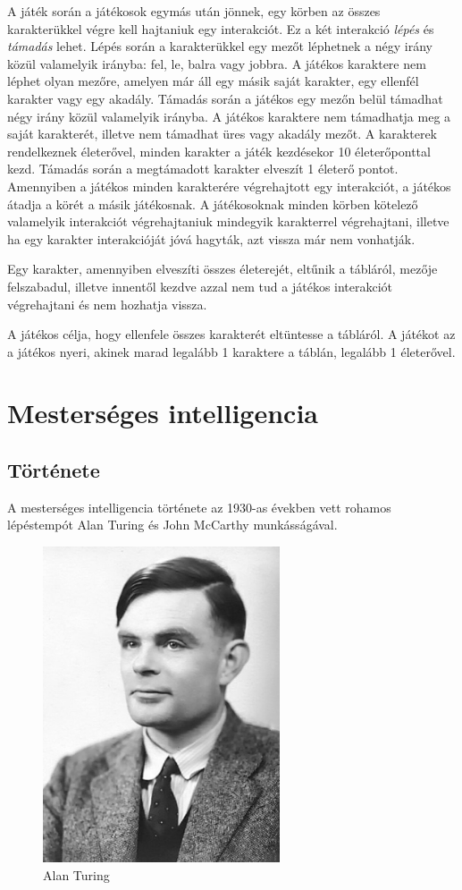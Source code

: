 \documentclass[
]{thesis-ekf}
\theoremstyle{definition}
\theoremstyle{remark}
\begin{document}
A játék során a játékosok egymás után jönnek, egy körben az összes karakterükkel végre kell hajtaniuk egy interakciót. Ez a két interakció \emph{lépés} és \emph{támadás} lehet. Lépés során a karakterükkel egy mezőt léphetnek a négy irány közül valamelyik irányba: fel, le, balra vagy jobbra. A játékos karaktere nem léphet olyan mezőre, amelyen már áll egy másik saját karakter, egy ellenfél karakter vagy egy akadály. Támadás során a játékos egy mezőn belül támadhat négy irány közül valamelyik irányba. A játékos karaktere nem támadhatja meg a saját karakterét, illetve nem támadhat üres vagy akadály mezőt. A karakterek rendelkeznek életerővel, minden karakter a játék kezdésekor 10 életerőponttal kezd. Támadás során a megtámadott karakter elveszít 1 életerő pontot. Amennyiben a játékos minden karakterére végrehajtott egy interakciót, a játékos átadja a körét a másik játékosnak. A játékosoknak minden körben kötelező valamelyik interakciót végrehajtaniuk mindegyik karakterrel végrehajtani, illetve ha egy karakter interakcióját jóvá hagyták, azt vissza már nem vonhatják.

Egy karakter, amennyiben elveszíti összes életerejét, eltűnik a tábláról, mezője felszabadul, illetve innentől kezdve azzal nem tud a játékos interakciót végrehajtani és nem hozhatja vissza.
 
A játékos célja, hogy ellenfele összes karakterét eltüntesse a tábláról. A játékot az a játékos nyeri, akinek marad legalább 1 karaktere a táblán, legalább 1 életerővel.

\chapter{Mesterséges intelligencia}

\section{Története}

A mesterséges intelligencia története az 1930-as években vett rohamos lépéstempót Alan Turing és John McCarthy munkásságával.

\begin{figure}[h!]
	\centering
	\includegraphics[width=7cm]{./pictures/Alan_Turing.jpg}
	\caption{Alan Turing}
	\label{Turing}
\end{figure} 
\end{document}
